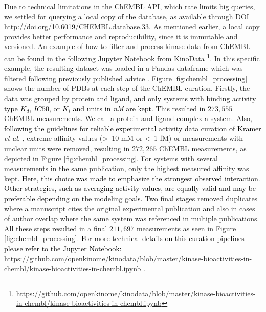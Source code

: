 \documentclass[9pt,lessons]{livecoms}
\newcommand{\revision}[1]{\textcolor{black}{#1}}
\begin{document}
Due to technical limitations in the ChEMBL API, which rate limits big queries, we settled for querying a local copy of the database, as available through DOI \url{http://doi.org/10.6019/CHEMBL.database.33}. 
As mentioned earlier, a local copy provides better performance and reproducibility, since it is immutable and versioned. 
An example of how to filter and process kinase data from ChEMBL can be found in the following Jupyter Notebook from KinoData \footnote{\url{https://github.com/openkinome/kinodata/blob/master/kinase-bioactivities-in-chembl/kinase-bioactivities-in-chembl.ipynb}}.  In this specific example, the resulting dataset was loaded in a Pandas dataframe which was filtered following previously published advice \cite{Kalliokoski2013, Kramer2012}. 
Figure \ref{fig:chembl_processing} shows the number of PDBs at each step of the ChEMBL curation. Firstly, the data was grouped by protein and ligand, \revision{and only systems with binding activity type $K_d$, $IC50$, or $K_i$ and units in \textit{nM} are kept.} %
This resulted in $273,555$ ChEMBL measurements. We call a protein and ligand complex a system. %
Also, \revision{following the guidelines for reliable experimental activity data curation of Kramer \textit{et al.} \cite{kramer2012experimental}}, extreme affinity values (\textgreater\ 10 mM or \textless\ 1 fM) or measurements with unclear units were removed, resulting in $272,265$ ChEMBL measurements, as depicted in Figure \ref{fig:chembl_processing}. For systems with several measurements in the same publication, only the highest measured affinity was kept. \revision{Here, this choice was made to emphasize the strongest observed interaction. Other strategies, such as averaging activity values, are equally valid and may be preferable depending on the modeling goals. \cite{hernandez2023experimental}} Two final stages removed duplicates where a manuscript cites the original experimental publication and also in cases of author overlap where the same system was referenced in multiple publications. All these steps resulted in a final $211,697$ measurements as seen in Figure \ref{fig:chembl_processing}. \revision{For more technical details on this curation pipelines please refer to the Jupyter Notebook: \url{https://github.com/openkinome/kinodata/blob/master/kinase-bioactivities-in-chembl/kinase-bioactivities-in-chembl.ipynb} .} 
\end{document}
